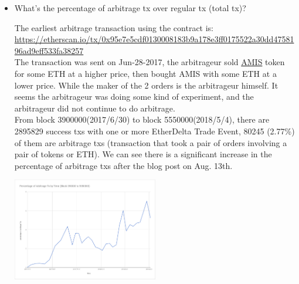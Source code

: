 \documentclass[conference]{IEEEtran}
\begin{document}
\begin{itemize}
    \item What’s the percentage of arbitrage tx over regular tx (total tx)?
    
    The earliest arbitrage transaction using the contract is: \\ \url{https://etherscan.io/tx/0x95e7e5cdf0130008183b9a178e3ff0175522a30dd4758196ad9eff533fa38257} \\
    The transaction was sent on Jun-28-2017, the arbitrageur sold \href{https://coinmarketcap.com/currencies/amis/}{AMIS} token for some ETH at a higher price, then bought AMIS with some ETH at a lower price. While the maker of the 2 orders is the arbitrageur himself. It seems the arbitrageur was doing some kind of experiment, and the arbitrageur did not continue to do arbitrage. \\
    From block 3900000(2017/6/30) to block 5550000(2018/5/4), there are 2895829 success txs with one or more EtherDelta Trade Event, 80245 (2.77\%) of them are arbitrage txs (transaction that took a pair of orders involving a pair of tokens or ETH). We can see there is a significant increase in the percentage of arbitrage txs after the blog post on Aug. 13th.
    
    \includegraphics[width=0.5\textwidth]{figures/percentage_by_time.pdf}
    

\end{itemize}
\end{document}
